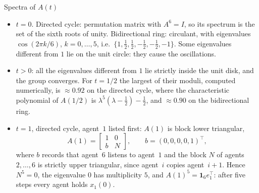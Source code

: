\begin{frame}[label=bk-spectra]{Spectra of $A(t)$}
  \small
  \begin{itemize}
    \item $t = 0$. Directed cycle: permutation matrix with $A^6 = I$, so its spectrum is the
          set of the sixth roots of unity. Bidirectional ring: circulant, with eigenvalues
          $\cos(2\pi k/6)$, $k = 0, \dots, 5$, i.e.\
          $\{1, \frac12, \frac12, -\frac12, -\frac12, -1\}$. Some eigenvalues different from
          $1$ lie on the unit circle: they cause the oscillations.
    \item $t > 0$: all the eigenvalues different from $1$ lie strictly inside the unit
          disk, and the group converges. For $t = 1/2$ the largest of their moduli,
          computed numerically, is $\approx 0.92$ on the directed cycle, where the
          characteristic polynomial of $A(1/2)$ is
          $\lambda^5(\lambda - \tfrac12) - \tfrac12$, and $\approx 0.90$ on the
          bidirectional ring.
    \item $t = 1$, directed cycle, agent~$1$ listed first: $A(1)$ is block lower
          triangular,
          \[ A(1) = \begin{bmatrix} 1 & 0 \\ b & N \end{bmatrix}, \qquad
             b = (0, 0, 0, 0, 1)^\top, \]
          where $b$ records that agent~$6$ listens to agent~$1$ and the block $N$ of agents
          $2, \dots, 6$ is strictly upper triangular, since agent~$i$ copies agent~$i+1$.
          Hence $N^5 = 0$, the eigenvalue $0$ has multiplicity $5$, and
          $A(1)^5 = \mathbf{1}_6 e_1^\top$: after five steps every agent holds $x_1(0)$.
  \end{itemize}
\end{frame}

